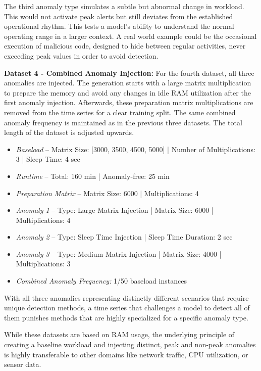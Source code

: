 \documentclass[12pt,oneside]{article}
\begin{document}
The third anomaly type simulates a subtle but abnormal change in workload. This would not activate peak alerts but still deviates from the established operational rhythm. This tests a model's ability to understand the normal operating range in a larger context. A real world example could be the occasional execution of malicious code, designed to hide between regular activities, never exceeding peak values in order to avoid detection.


\textbf{Dataset 4 - Combined Anomaly Injection:} For the fourth dataset, all three anomalies are injected. The generation starts with a large matrix multiplication to prepare the memory and avoid any changes in idle RAM utilization after the first anomaly injection. Afterwards, these preparation matrix multiplications are removed from the time series for a clear training split. The same combined anomaly frequency is maintained as in the previous three datasets. The total length of the dataset is adjusted upwards.
\begin{itemize}
    \item \textit{Baseload} -- Matrix Size: [3000, 3500, 4500, 5000] | Number of Multiplications: 3 | Sleep Time: 4 sec
    \item \textit{Runtime} -- Total: 160 min | Anomaly-free: 25 min
    \item \textit{Preparation Matrix} -- Matrix Size: 6000 | Multiplications: 4
    \item \textit{Anomaly 1} -- Type: Large Matrix Injection | Matrix Size: 6000 | Multiplications: 4
    \item \textit{Anomaly 2} -- Type: Sleep Time Injection | Sleep Time Duration: 2 sec
    \item \textit{Anomaly 3} -- Type: Medium Matrix Injection | Matrix Size: 4000 | Multiplications: 3
    \item \textit{Combined Anomaly Frequency:} 1/50 baseload instances
\end{itemize}

With all three anomalies representing distinctly different scenarios that require unique detection methods, a time series that challenges a model to detect all of them punishes methods that are highly specialized for a specific anomaly type. \par

While these datasets are based on RAM usage, the underlying principle of creating a baseline workload and injecting distinct, peak and non-peak anomalies is highly transferable to other domains like network traffic, CPU utilization, or sensor data.
\end{document}
